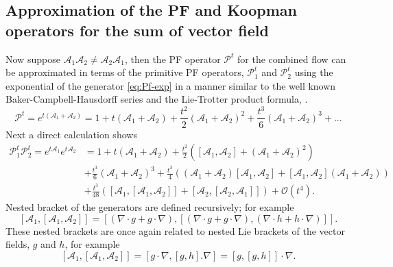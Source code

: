 \documentclass[pdflatex,sn-mathphys]{sn-jnl}%
\theoremstyle{thmstyleone}%
\theoremstyle{thmstyletwo}%
\theoremstyle{thmstylethree}%
\begin{document}
\subsection{Approximation of the PF and Koopman operators for the sum of vector field} \label{sec:approx}
Now suppose $\mathcal{A}_1\mathcal{A}_2 \neq \mathcal{A}_2\mathcal{A}_1$, then the PF operator $\mathcal{P}^t$ for the combined flow can be approximated in terms of the primitive PF operators, $\mathcal{P}_1^t$ and $\mathcal{P}_2^t$ using the exponential of the generator \eqref{eq:Pf-exp} in a manner similar to the well known Baker-Campbell-Hausdorff series and the Lie-Trotter product formula, \cite{trotter_1959, kirillov_2017}.
\[
\mathcal{P}^t = e^{t(\mathcal{A}_1+\mathcal{A}_2)} = 1 + t(\mathcal{A}_1+\mathcal{A}_2) + \frac{t^2}{2}\left( \mathcal{A}_1+\mathcal{A}_2\right)^2 + \frac{t^3}{6}\left(\mathcal{A}_1+\mathcal{A}_2\right)^3 + ...
\]
Next a direct calculation shows
\[
\begin{split}
\mathcal{P}^t_1\mathcal{P}^t_2  = e^{t\mathcal{A}_1}e^{t\mathcal{A}_2} &= 1 + t(\mathcal{A}_1+\mathcal{A}_2) + \frac{t^2}{2}\left( [\mathcal{A}_1, \mathcal{A}_2] + \left(\mathcal{A}_1+\mathcal{A}_2\right)^2 \right)   \\
&+\frac{t^3}{6}\left(\mathcal{A}_1+\mathcal{A}_2\right)^3 + \frac{t^3}{4}\left((\mathcal{A}_1+\mathcal{A}_2) [\mathcal{A}_1, \mathcal{A}_2] + [\mathcal{A}_1, \mathcal{A}_2](\mathcal{A}_1+\mathcal{A}_2)\right) \\
&+\frac{t^3}{48}\left([\mathcal{A}_1, [\mathcal{A}_1,\mathcal{A}_2]] + [\mathcal{A}_2, [\mathcal{A}_2,\mathcal{A}_1]]\right) + \mathcal{O}(t^4).
\end{split}
\]
Nested bracket of the generators are defined recursively; for example \[
[\mathcal{A}_1, [\mathcal{A}_1,\mathcal{A}_2]] = [(\nabla \cdot g + g \cdot \nabla),[(\nabla \cdot g + g \cdot \nabla), (\nabla \cdot h + h \cdot \nabla)]]
.\]
These nested brackets are once again related to nested Lie brackets of the vector fields, $g$ and $h$, for example
\begin{equation}\label{eq:nested}
[\mathcal{A}_1, [\mathcal{A}_1,\mathcal{A}_2]] = [ g \cdot \nabla,[g,h].\nabla] = [g,[g,h]]\cdot \nabla.
\end{equation}
\end{document}
